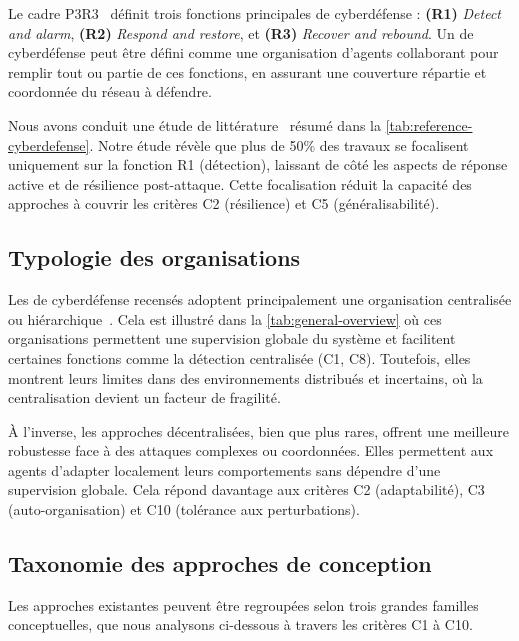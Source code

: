 Le cadre P3R3~\cite{theron_p3r3_2021} définit trois fonctions principales de cyberdéfense : \textbf{(R1)} \textit{Detect and alarm}, \textbf{(R2)} \textit{Respond and restore}, et \textbf{(R3)} \textit{Recover and rebound}. Un  de cyberdéfense peut être défini comme une organisation d'agents collaborant pour remplir tout ou partie de ces fonctions, en assurant une couverture répartie et coordonnée du réseau à défendre.

Nous avons conduit une étude de littérature~\cite{soule2023rjciathese} résumé dans la \autoref{tab:reference-cyberdefense}. Notre étude révèle que plus de 50\% des travaux se focalisent uniquement sur la fonction R1 (détection), laissant de côté les aspects de réponse active et de résilience post-attaque. Cette focalisation réduit la capacité des approches à couvrir les critères C2 (résilience) et C5 (généralisabilité).



\subsection*{Typologie des organisations}

Les  de cyberdéfense recensés adoptent principalement une organisation centralisée ou hiérarchique~\cite{soule2023ressithese}. Cela est illustré dans la \autoref{tab:general-overview} où ces organisations permettent une supervision globale du système et facilitent certaines fonctions comme la détection centralisée (C1, C8). Toutefois, elles montrent leurs limites dans des environnements distribués et incertains, où la centralisation devient un facteur de fragilité.

À l'inverse, les approches décentralisées, bien que plus rares, offrent une meilleure robustesse face à des attaques complexes ou coordonnées. Elles permettent aux agents d'adapter localement leurs comportements sans dépendre d'une supervision globale. Cela répond davantage aux critères C2 (adaptabilité), C3 (auto-organisation) et C10 (tolérance aux perturbations).



\subsection*{Taxonomie des approches de conception}

Les approches existantes peuvent être regroupées selon trois grandes familles conceptuelles, que nous analysons ci-dessous à travers les critères C1 à C10.

